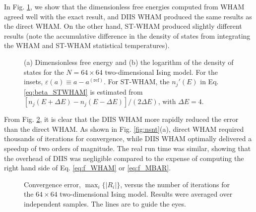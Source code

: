 \documentclass[reprint,superscriptaddress]{revtex4-1}
\begin{document}
In Fig. \ref{fig:is2ref},
we show that
the dimensionless free energies computed from WHAM
agreed well with the exact result\cite{
ferdinand1969},
and DIIS WHAM produced the same results
as the direct WHAM.
%
On the other hand,
ST-WHAM produced slightly different results
(note the accumulative difference
in the density of states
from integrating the WHAM and ST-WHAM
statistical temperatures).



\begin{figure}[h]
  \caption{
    \label{fig:is2ref}
    (a) Dimensionless free energy and
    (b) the logarithm of the density of states
    for the $N = 64\times64$ two-dimensional Ising model.
    For the insets,
    $\varepsilon(a) \equiv a - a^\mathrm{(ref)}$.
    For ST-WHAM,
    the $n_j'(E)$ in Eq. \eqref{eq:beta_STWHAM}
    is estimated from
    $[n_j(E + \Delta E) - n_j(E - \Delta E)]/(2 \Delta E)$,
    with $\Delta E = 4$.
  }
\end{figure}




From Fig. \ref{fig:is2trace},
it is clear that the DIIS WHAM more rapidly
reduced the error than the direct WHAM.
%
As shown in Fig. \ref{fig:nsnt}(a),
direct WHAM
required thousands of iterations for convergence,
while DIIS WHAM optimally
delivered a speedup of two orders of magnitude.
%
The real run time was similar,
showing that the overhead of DIIS was negligible
compared to the expense of computing
the right hand side of
Eq. \eqref{eq:f_WHAM} or \eqref{eq:f_MBAR}.






\begin{figure}[h]
  \caption{
    \label{fig:is2trace}
    Convergence error, $\max_i \{ |R_i| \}$,
    versus the number of iterations
    for the $64\times64$ two-dimensional Ising model.
    Results were averaged over independent samples.
    The lines are to guide the eyes.
  }
\end{figure}




\end{document}
